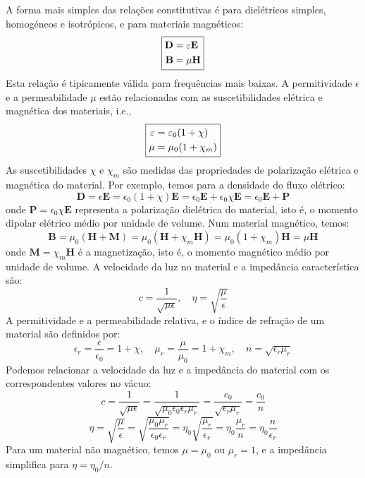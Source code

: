 A forma mais simples das relações constitutivas é para dielétricos simples, homogéneos e isotrópicos, e para materiais magnéticos:
$$
    \boxed{%
    \begin{aligned}
        \mathbf{D} &= \epsilon \mathbf{E} \\
        \mathbf{B} &= \mu \mathbf{H}
    \end{aligned}
    }
$$
Esta relação é tipicamente válida para frequências mais baixas. A permitividade $\epsilon$ e a permeabilidade $\mu$ estão relacionadas com as suscetibilidades elétrica e magnética dos materiais, i.e.,
$$
    \boxed{%
    \begin{aligned}
        \epsilon &= \epsilon_{0} (1 + \chi)  \\
        \mu &= \mu_{0} (1 + \chi_m)
    \end{aligned}
    }
$$
As suscetibilidades $\chi$ e $\chi_m$ são medidas das propriedades de polarização elétrica e magnética do material. Por exemplo, temos para a densidade do fluxo elétrico:
$$
    \mathbf{D} = \epsilon \mathbf{E} = \epsilon_{0} (1 + \chi) \mathbf{E} = \epsilon_{0} \mathbf{E} + \epsilon_{0} \chi \mathbf{E} = \epsilon_{0} \mathbf{E} + \mathbf{P}
$$
onde $\mathbf{P} = \epsilon_{0} \chi \mathbf{E}$ representa a polarização dielétrica do material, isto é, o momento dipolar elétrico médio por unidade de volume. Num material magnético, temos:
$$
    \mathbf{B} = \mu_0 (\mathbf{H} + \mathbf{M}) = \mu_0 (\mathbf{H} + \chi_m \mathbf{H}) = \mu_0 (1 + \chi_m) \mathbf{H} = \mu \mathbf{H}
$$
onde $\mathbf{M} = \chi_m \mathbf{H}$ é a magnetização, isto é, o momento magnético médio por unidade de volume. A velocidade da luz no material e a impedância característica são:
$$
    c = \frac{1}{\sqrt{\mu \epsilon}} , \quad \eta = \sqrt{\frac{\mu}{\epsilon}}
$$
A permitividade e a permeabilidade relativa, e o índice de refração de um material são definidos por:
$$
    \epsilon_{r} = \frac{\epsilon}{\epsilon_{0}} = 1 + \chi, \quad \mu_{r} = \frac{\mu}{\mu_0} = 1 + \chi_m, \quad n = \sqrt{\epsilon_{r} \mu_{r}}
$$
Podemos relacionar a velocidade da luz e a impedância do material com os correspondentes valores no vácuo:
$$
c = \frac{1}{\sqrt{\mu \epsilon}} = \frac{1}{\sqrt{\mu_0 \epsilon_{0} \epsilon_{r} \mu_{r}}} = \frac{c_0}{\sqrt{\epsilon_{r} \mu_{r}}} = \frac{c_0}{n}
$$
$$
    \eta = \sqrt{\frac{\mu}{\epsilon}} = \sqrt{\frac{\mu_0 \mu_{r}}{\epsilon_{0} \epsilon_{r}}} = \eta_0 \sqrt{\frac{\mu_{r}}{\epsilon_{r}}} = \eta_0 \frac{\mu_r}{n} = \eta_0 \frac{n}{\epsilon_r}
$$
Para um material não magnético, temos $\mu = \mu_0$ ou $\mu_r = 1$, e a impedância simplifica para $\eta = \eta_0/n$.

